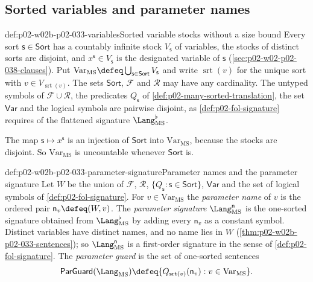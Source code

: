 \subsection{Sorted variables and parameter names}
\label{sec:p02-w02b-p02-033-parameters}

\begin{hbconvention}{def:p02-w02b-p02-033-variables}{Sorted variable stocks without a size bound}
Every sort \(\mathsf s\in\mathsf{Sort}\) has a countably infinite stock
\(V_{\mathsf s}\) of variables, the stocks of distinct sorts are disjoint, and
\(x^{\mathsf s}\in V_{\mathsf s}\) is the designated variable of
\(\mathsf s\) (\cref{sec:p02-w02-p02-038-clauses}).  Put
\(\mathrm{Var}_{\mathrm{MS}}\defeq\bigcup_{\mathsf s\in\mathsf{Sort}}V_{\mathsf s}\)
and write \(\operatorname{srt}(v)\) for the unique sort with
\(v\in V_{\operatorname{srt}(v)}\).  The sets \(\mathsf{Sort}\),
\(\mathcal F\) and \(\mathcal R\) may have any cardinality.  The untyped
symbols of \(\mathcal F\cup\mathcal R\), the predicates \(Q_{\mathsf s}\) of
\cref{def:p02-many-sorted-translation}, the set \(\mathsf{Var}\) and the
logical symbols are pairwise disjoint, as \cref{def:p02-fol-signature}
requires of the flattened signature \(\Lang_{\mathrm{MS}}^{\flat}\).
\end{hbconvention}

The map \(\mathsf s\mapsto x^{\mathsf s}\) is an injection of
\(\mathsf{Sort}\) into \(\mathrm{Var}_{\mathrm{MS}}\), because the stocks are
disjoint.  So \(\mathrm{Var}_{\mathrm{MS}}\) is uncountable whenever
\(\mathsf{Sort}\) is.

\begin{hbdefinition}{def:p02-w02b-p02-033-parameter-signature}{Parameter names and the parameter signature}
Let \(W\) be the union of \(\mathcal F\), \(\mathcal R\),
\(\{Q_{\mathsf s}:\mathsf s\in\mathsf{Sort}\}\), \(\mathsf{Var}\) and the set
of logical symbols of \cref{def:p02-fol-signature}.  For
\(v\in\mathrm{Var}_{\mathrm{MS}}\) the \emph{parameter name} of \(v\) is the
ordered pair \(\mathsf n_v\defeq(W,v)\).  The \emph{parameter signature}
\(\Lang_{\mathrm{MS}}^{\mathsf n}\) is the one-sorted signature obtained from
\(\Lang_{\mathrm{MS}}^{\flat}\) by adding every \(\mathsf n_v\) as a
constant symbol.  Distinct variables have distinct names, and no name lies in
\(W\) (\cref{thm:p02-w02b-p02-033-sentences}); so
\(\Lang_{\mathrm{MS}}^{\mathsf n}\) is a first-order signature in the sense of
\cref{def:p02-fol-signature}.
The \emph{parameter guard} is the set of one-sorted sentences
\[
 \mathsf{ParGuard}(\Lang_{\mathrm{MS}})\defeq
 \{Q_{\operatorname{srt}(v)}(\mathsf n_v):v\in\mathrm{Var}_{\mathrm{MS}}\}.
\]
\end{hbdefinition}

